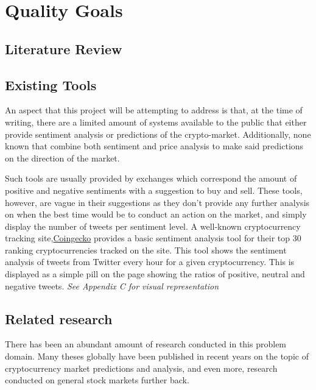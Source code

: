 \documentclass[oneside, 12pt]{article}
\begin{document}
	\section{Quality Goals}
		
	
	\newpage
	
	\begin{center}
		\section{Literature Review}\label{literature}
	\end{center}
		\subsection{Existing Tools}
		An aspect that this project will be attempting to address is that, at the time of writing, there are a limited amount of systems available to the public that either provide sentiment analysis or predictions of the crypto-market. Additionally, none known that combine both sentiment and price analysis to make said predictions on the direction of the market.
		
		Such tools are usually provided by exchanges which correspond the amount of positive and negative sentiments with a suggestion to buy and sell. These tools, however, are vague in their suggestions as they don't provide any further analysis on when the best time would be to conduct an action on the market, and simply display the number of tweets per sentiment level. A well-known cryptocurrency tracking site,\href{https://www.coingecko.com}{Coingecko} provides a basic sentiment analysis tool for their top 30 ranking cryptocurrencies tracked on the site. This tool shows the sentiment analysis of tweets from Twitter every hour for a given cryptocurrency. This is displayed as a simple pill on the page showing the ratios of positive, neutral and negative tweets. \textit{See Appendix C for visual representation}
			
		\subsection{Related research}
		
		There has been an abundant amount of research conducted in this problem domain. Many theses globally have been published in recent years on the topic of cryptocurrency market predictions and analysis, and even more, research conducted on general stock markets further back. 
		
\end{document}
